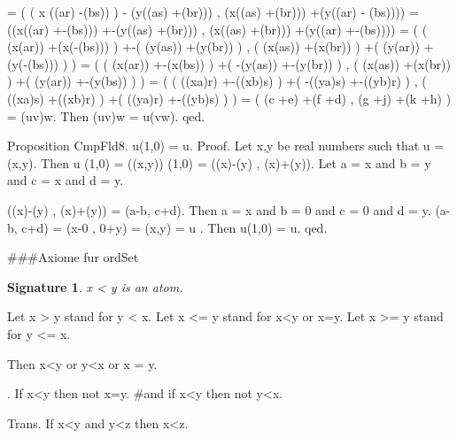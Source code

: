 \documentclass{article}
\newenvironment{forthel}{\begin{leftbar}}{\end{leftbar}}
\newtheorem{axiom}{\begin{axiom} }
\newtheorem{signature}{Signature}
\newcommand{\cmul}{\cdot}
\newcommand{\rmul}{\cdot}
\newcommand{\radd}{+}
\begin{document}
\begin{forthel}
		  = (  ( x \rmul  ((a\rmul r) -(b\rmul s)) ) - (y\rmul ((a\rmul s) \radd  (b\rmul r))) , (x\rmul ((a\rmul s) \radd  (b\rmul r))) \radd  (y\rmul ((a\rmul r) - (b\rmul s))))
		  = ((x\rmul ((a\rmul r) \radd  -(b\rmul s))) \radd  -(y\rmul ((a\rmul s) \radd  (b\rmul r))) , (x\rmul ((a\rmul s) 	\radd  (b\rmul r))) \radd  (y\rmul ((a\rmul r) \radd  -(b\rmul s))))
		  = (  ( (x\rmul (a\rmul r)) \radd  (x\rmul (-(b\rmul s))) ) \radd  -( (y\rmul (a\rmul s)) \radd  (y\rmul (b\rmul r)) )  , ( (x\rmul (a\rmul s)) \radd  (x\rmul (b\rmul r)) ) \radd  ( (y\rmul (a\rmul r)) \radd  (y\rmul (-(b\rmul s))) ) )
		  = (  ( (x\rmul (a\rmul r)) \radd  -(x\rmul (b\rmul s)) ) \radd  ( -(y\rmul (a\rmul s)) \radd  -(y\rmul (b\rmul r)) )  ,  ( (x\rmul (a\rmul s)) \radd  (x\rmul (b\rmul r)) ) \radd  ( (y\rmul (a\rmul r)) \radd  -(y\rmul (b\rmul s)) ) )
		  = (  ( ((x\rmul a)\rmul r) \radd  -((x\rmul b)\rmul s) ) \radd  ( -((y\rmul a)\rmul s) \radd  -((y\rmul b)\rmul r) )  ,  ( ((x\rmul a)\rmul s) \radd  ((x\rmul b)\rmul r) ) \radd  ( ((y\rmul a)\rmul r) \radd  -((y\rmul b)\rmul s) ) )
		  = ( (c \radd  e) \radd  (f \radd  d) , (g \radd  j) \radd  (k \radd  h) ) = (u\cmul v)\cmul w.
Then (u\cmul v)\cmul w = u\cmul (v\cmul w). qed.


Proposition CmpFld8. u\cmul (1,0) = u.
Proof. Let x,y be real numbers such that u = (x,y). Then u \cmul  (1,0) = ((x,y)) \cmul  (1,0) = ((x\rmul 1)-(y\rmul 0) , (x\rmul 0)\radd (y\rmul 1)). 
	Let a = x\rmul 1 and b = y\rmul 0 and c = x\rmul 0 and d = y\rmul 1.
		
	((x\rmul 1)-(y\rmul 0) , (x\rmul 0)\radd (y\rmul 1)) = (a-b, c\radd d).
	Then a = x and b = 0 and c = 0 and d = y.
 	(a-b, c\radd d) = (x-0 , 0\radd y) = (x,y) = u .
Then u\cmul (1,0) = u.
qed.




###Axiome fur ordSet

\begin{signature} x < y is an atom.
\end{signature}
Let x > y stand for y < x.
Let x <= y stand for x<y or x=y.
Let x >= y stand for y <= x.

\begin{axiom}[InEqCompl] Then x<y or y<x or x = y.
\end{axiom}
\begin{axiom} . If x<y then not x=y. #and if x<y then not y<x.
\end{axiom}
\begin{axiom}  Trans. If x<y and y<z then x<z.
\end{axiom}


\end{forthel}
\end{document}
